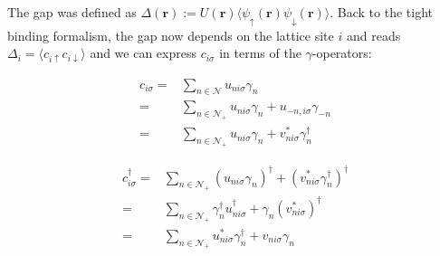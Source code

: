 \documentclass[../main.tex]{subfile}
\begin{document}
The gap was defined as $\Delta(\bm{r}) := U(\bm{r}) \langle \psi_{\uparrow}(\bm{r})\psi_{\downarrow}(\bm{r})\rangle$. Back to the tight binding formalism,
the gap now depends on the lattice site $i$ and reads
$\Delta_i = \langle c_{i\uparrow}c_{i\downarrow}\rangle$ and we can express $c_{i\sigma}$ in terms of the $\gamma$-operators:\\
\begin{center}
\begin{minipage}{0.4\textwidth}
\begin{equation}
    \begin{aligned}\label{eq:BdG_transf_c}
    c_{i\sigma} =& \sum_{n\in\mathcal{N}} u_{ni\sigma}\gamma_n \\
        =& \sum_{n\in\mathcal{N}_+} u_{ni\sigma}\gamma_n + u_{-n,i\sigma}\gamma_{-n}\\
        =& \sum_{n\in\mathcal{N}_+} u_{ni\sigma}\gamma_n + v_{ni\sigma}^{\ast}\gamma_{n}^{\dagger}
    \end{aligned}
\end{equation}
\end{minipage}\hspace{0.05\textwidth}
\begin{minipage}{0.03\textwidth}
\end{minipage}
\begin{minipage}{0.45\textwidth}
    \begin{equation}
        \begin{aligned}\label{eq:BdG_transf_c_dagg}
        c_{i\sigma}^{\dagger} =& \sum_{n\in\mathcal{N}_+}( u_{ni\sigma}\gamma_n)^{\dagger} +( v_{ni\sigma}^{\ast}\gamma_{n}^{\dagger})^{\dagger} \\
            =& \sum_{n\in\mathcal{N}_+} \gamma_n^{\dagger}u_{ni\sigma}^{\dagger} + \gamma_{n}(v_{ni\sigma}^{\ast})^{\dagger} \\
            =& \sum_{n\in\mathcal{N}_+} u_{ni\sigma}^{\ast}\gamma_n^{\dagger} + v_{ni\sigma}\gamma_{n} \\
        \end{aligned}
    \end{equation}
\end{minipage}
\end{center}
\end{document}
